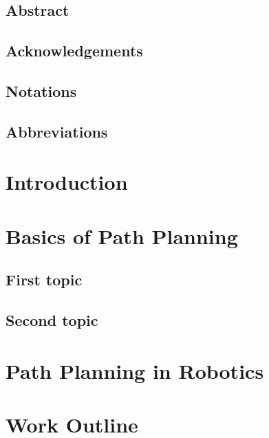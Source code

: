 \documentclass{thesisreport}
\begin{document}
   
 
  \section*{Abstract}
 
 \section*{Acknowledgements}
 
 
 
 \section*{Notations}
 

  \section*{Abbreviations}
 
 \newpage
 
 \listoffigures
 
\listoftables
 
 \tableofcontents
 
 
 \chapter*{Introduction}
 
 
 \chapter{Basics of Path Planning}
 
 \section{First topic}
 
 \section{Second topic}
 
 \chapter{Path Planning in Robotics} 
 
 \chapter{Work Outline}
  
\end{document}
